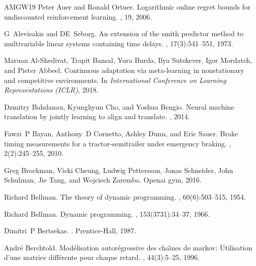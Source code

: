 \begin{thebibliography}{AMGW{\etalchar{+}}19}
Peter Auer and Ronald Ortner.
\newblock Logarithmic online regret bounds for undiscounted reinforcement learning.
, 19, 2006.

G~Alevisakis and DE~Seborg.
\newblock An extension of the smith predictor method to multivariable linear systems containing time delays.
, 17(3):541--551, 1973.

Maruan Al-Shedivat, Trapit Bansal, Yura Burda, Ilya Sutskever, Igor Mordatch, and Pieter Abbeel.
\newblock Continuous adaptation via meta-learning in nonstationary and competitive environments.
\newblock In {\em International Conference on Learning Representations (ICLR)}, 2018.

Dzmitry Bahdanau, Kyunghyun Cho, and Yoshua Bengio.
\newblock Neural machine translation by jointly learning to align and translate.
, 2014.

Fawzi~P Bayan, Anthony~D Cornetto, Ashley Dunn, and Eric Sauer.
\newblock Brake timing measurements for a tractor-semitrailer under emergency braking.
, 2(2):245--255, 2010.

Greg Brockman, Vicki Cheung, Ludwig Pettersson, Jonas Schneider, John Schulman, Jie Tang, and Wojciech Zaremba.
\newblock Openai gym, 2016.

Richard Bellman.
\newblock The theory of dynamic programming.
, 60(6):503--515, 1954.

Richard Bellman.
\newblock Dynamic programming.
, 153(3731):34--37, 1966.

Dimitri~P Bertsekas.
.
\newblock Prentice-Hall, 1987.

Andr{\'e} Berchtold.
\newblock Mod{\'e}lisation autor{\'e}gressive des cha{\^\i}nes de markov: Utilisation d'une matrice diff{\'e}rente pour chaque retard.
, 44(3):5--25, 1996.


\end{thebibliography}
